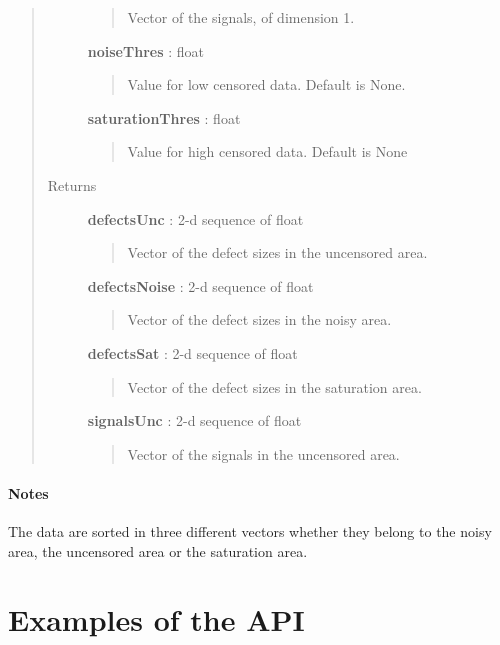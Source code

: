 \documentclass[letterpaper,10pt,english]{sphinxmanual}
\begin{document}
\begin{fulllineitems}
\begin{fulllineitems}
\begin{quote}
\begin{description}
\begin{quote}
Vector of the signals, of dimension 1.
\end{quote}

\textbf{noiseThres} : float
\begin{quote}

Value for low censored data. Default is None.
\end{quote}

\textbf{saturationThres} : float
\begin{quote}

Value for high censored data. Default is None
\end{quote}

\item[{Returns}] \leavevmode
\textbf{defectsUnc} : 2-d sequence of float
\begin{quote}

Vector of the defect sizes in the uncensored area.
\end{quote}

\textbf{defectsNoise} : 2-d sequence of float
\begin{quote}

Vector of the defect sizes in the noisy area.
\end{quote}

\textbf{defectsSat} : 2-d sequence of float
\begin{quote}

Vector of the defect sizes in the saturation area.
\end{quote}

\textbf{signalsUnc} : 2-d sequence of float
\begin{quote}

Vector of the signals in the uncensored area.
\end{quote}

\end{description}\end{quote}
\paragraph{Notes}

The data are sorted in three different vectors whether they belong to
the noisy area, the uncensored area or the saturation area.

\end{fulllineitems}


\end{fulllineitems}



\section{Examples of the API}
\label{examples:examples-of-the-api}\label{examples::doc}
\end{document}
